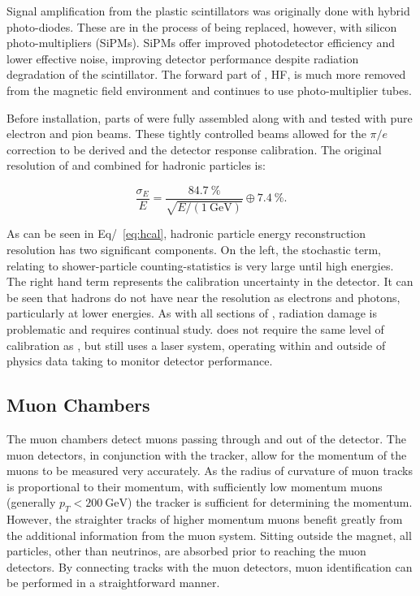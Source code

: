 Signal amplification from the plastic scintillators was originally done with hybrid photo-diodes.  These are in the process of being replaced, however, with silicon photo-multipliers (SiPMs).  SiPMs offer improved photodetector efficiency and lower effective noise, improving detector performance despite radiation degradation of the scintillator.  The forward part of \HCAL, HF, is much more removed from the magnetic field environment and continues to use photo-multiplier tubes.

Before installation, parts of \HCAL were fully assembled along with \ECAL and tested with pure electron and pion beams.  These tightly controlled beams allowed for the \ensuremath{\pi / e} correction to be derived and the detector response calibration. The original resolution of \CMS \ECAL and \HCAL combined for hadronic particles is:

\begin{equation}\label{eq:hcal}
    \frac{\sigma_{E}}{E}
    =   
    \frac{\SI{84.7}{\%}}{\sqrt{E/\left(\SI{1}{\GeV}\right)}}
    \oplus
    \SI{7.4}{\%}.
\end{equation}

As can be seen in Eq/~\ref{eq:hcal}, hadronic particle energy reconstruction resolution has two significant components. On the left, the stochastic term, relating to shower-particle counting-statistics is very large until high energies. The right hand term represents the calibration uncertainty in the detector. It can be seen that hadrons do not have near the resolution as electrons and photons, particularly at lower energies. As with all sections of \CMS, radiation damage is problematic and requires continual study.  \HCAL does not require the same level of calibration as \ECAL, but still uses a laser system, operating within and outside of physics data taking to monitor detector performance.

\subsection{Muon Chambers}

The muon chambers detect muons passing through and out of the detector. The muon detectors, in conjunction with the tracker, allow for the momentum of the muons to be measured very accurately. As the radius of curvature of muon tracks is proportional to their momentum, with sufficiently low momentum muons (generally \ensuremath{p_{T} < \SI{200}{\GeV}}) the tracker is sufficient for determining the momentum.  However, the straighter tracks of higher momentum muons benefit greatly from the additional information from the muon system. Sitting outside the \CMS magnet, all particles, other than neutrinos, are absorbed prior to reaching the muon detectors.  By connecting tracks with the muon detectors, muon identification can be performed in a straightforward manner.

